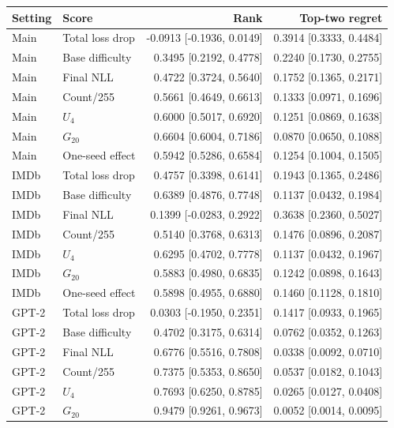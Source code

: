 \begin{table}[tp]
\centering
\footnotesize
\setlength{\tabcolsep}{3pt}
\begin{tabular}{llrr}
\toprule
Setting & Score & Rank & Top-two regret \\
\midrule
Main & Total loss drop & -0.0913 [-0.1936, 0.0149] & 0.3914 [0.3333, 0.4484] \\
Main & Base difficulty & 0.3495 [0.2192, 0.4778] & 0.2240 [0.1730, 0.2755] \\
Main & Final NLL & 0.4722 [0.3724, 0.5640] & 0.1752 [0.1365, 0.2171] \\
Main & Count/255 & 0.5661 [0.4649, 0.6613] & 0.1333 [0.0971, 0.1696] \\
Main & $U_4$ & 0.6000 [0.5017, 0.6920] & 0.1251 [0.0869, 0.1638] \\
Main & $G_{20}$ & 0.6604 [0.6004, 0.7186] & 0.0870 [0.0650, 0.1088] \\
Main & One-seed effect & 0.5942 [0.5286, 0.6584] & 0.1254 [0.1004, 0.1505] \\
IMDb & Total loss drop & 0.4757 [0.3398, 0.6141] & 0.1943 [0.1365, 0.2486] \\
IMDb & Base difficulty & 0.6389 [0.4876, 0.7748] & 0.1137 [0.0432, 0.1984] \\
IMDb & Final NLL & 0.1399 [-0.0283, 0.2922] & 0.3638 [0.2360, 0.5027] \\
IMDb & Count/255 & 0.5140 [0.3768, 0.6313] & 0.1476 [0.0896, 0.2087] \\
IMDb & $U_4$ & 0.6295 [0.4702, 0.7778] & 0.1137 [0.0432, 0.1967] \\
IMDb & $G_{20}$ & 0.5883 [0.4980, 0.6835] & 0.1242 [0.0898, 0.1643] \\
IMDb & One-seed effect & 0.5898 [0.4955, 0.6880] & 0.1460 [0.1128, 0.1810] \\
GPT-2 & Total loss drop & 0.0303 [-0.1950, 0.2351] & 0.1417 [0.0933, 0.1965] \\
GPT-2 & Base difficulty & 0.4702 [0.3175, 0.6314] & 0.0762 [0.0352, 0.1263] \\
GPT-2 & Final NLL & 0.6776 [0.5516, 0.7808] & 0.0338 [0.0092, 0.0710] \\
GPT-2 & Count/255 & 0.7375 [0.5353, 0.8650] & 0.0537 [0.0182, 0.1043] \\
GPT-2 & $U_4$ & 0.7693 [0.6250, 0.8785] & 0.0265 [0.0127, 0.0408] \\
GPT-2 & $G_{20}$ & 0.9479 [0.9261, 0.9673] & 0.0052 [0.0014, 0.0095] \\

\end{tabular}
\end{table}
